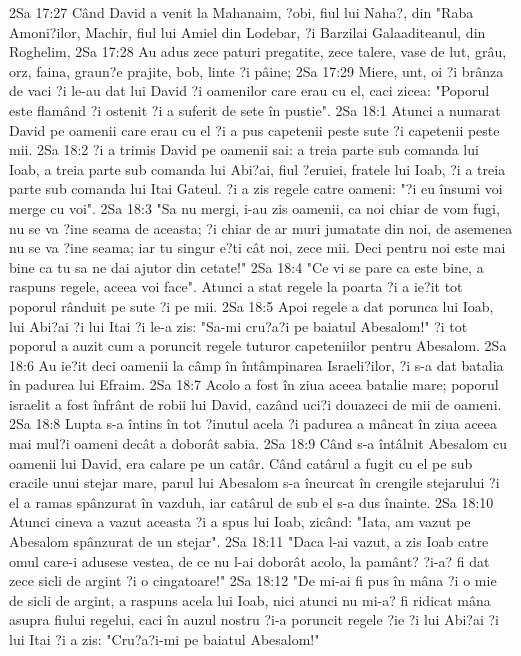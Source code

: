 2Sa 17:27  Când David a venit la Mahanaim, ?obi, fiul lui Naha?, din "Raba Amoni?ilor, Machir, fiul lui Amiel din Lodebar, ?i Barzilai Galaaditeanul, din Roghelim,
2Sa 17:28  Au adus zece paturi pregatite, zece talere, vase de lut, grâu, orz, faina, graun?e prajite, bob, linte ?i pâine;
2Sa 17:29  Miere, unt, oi ?i brânza de vaci ?i le-au dat lui David ?i oamenilor care erau cu el, caci zicea: "Poporul este flamând ?i ostenit ?i a suferit de sete în pustie".
2Sa 18:1  Atunci a numarat David pe oamenii care erau cu el ?i a pus capetenii peste sute ?i capetenii peste mii.
2Sa 18:2  ?i a trimis David pe oamenii sai: a treia parte sub comanda lui Ioab, a treia parte sub comanda lui Abi?ai, fiul ?eruiei, fratele lui Ioab, ?i a treia parte sub comanda lui Itai Gateul. ?i a zis regele catre oameni: "?i eu însumi voi merge cu voi".
2Sa 18:3  "Sa nu mergi, i-au zis oamenii, ca noi chiar de vom fugi, nu se va ?ine seama de aceasta; ?i chiar de ar muri jumatate din noi, de asemenea nu se va ?ine seama; iar tu singur e?ti cât noi, zece mii. Deci pentru noi este mai bine ca tu sa ne dai ajutor din cetate!"
2Sa 18:4  "Ce vi se pare ca este bine, a raspuns regele, aceea voi face". Atunci a stat regele la poarta ?i a ie?it tot poporul rânduit pe sute ?i pe mii.
2Sa 18:5  Apoi regele a dat porunca lui Ioab, lui Abi?ai ?i lui Itai ?i le-a zis: "Sa-mi cru?a?i pe baiatul Abesalom!" ?i tot poporul a auzit cum a poruncit regele tuturor capeteniilor pentru Abesalom.
2Sa 18:6  Au ie?it deci oamenii la câmp în întâmpinarea Israeli?ilor, ?i s-a dat batalia în padurea lui Efraim.
2Sa 18:7  Acolo a fost în ziua aceea batalie mare; poporul israelit a fost înfrânt de robii lui David, cazând uci?i douazeci de mii de oameni.
2Sa 18:8  Lupta s-a întins în tot ?inutul acela ?i padurea a mâncat în ziua aceea mai mul?i oameni decât a doborât sabia.
2Sa 18:9  Când s-a întâlnit Abesalom cu oamenii lui David, era calare pe un catâr. Când catârul a fugit cu el pe sub cracile unui stejar mare, parul lui Abesalom s-a încurcat în crengile stejarului ?i el a ramas spânzurat în vazduh, iar catârul de sub el s-a dus înainte.
2Sa 18:10  Atunci cineva a vazut aceasta ?i a spus lui Ioab, zicând: "Iata, am vazut pe Abesalom spânzurat de un stejar".
2Sa 18:11  "Daca l-ai vazut, a zis Ioab catre omul care-i adusese vestea, de ce nu l-ai doborât acolo, la pamânt? ?i-a? fi dat zece sicli de argint ?i o cingatoare!"
2Sa 18:12  "De mi-ai fi pus în mâna ?i o mie de sicli de argint, a raspuns acela lui Ioab, nici atunci nu mi-a? fi ridicat mâna asupra fiului regelui, caci în auzul nostru ?i-a poruncit regele ?ie ?i lui Abi?ai ?i lui Itai ?i a zis: "Cru?a?i-mi pe baiatul Abesalom!"
